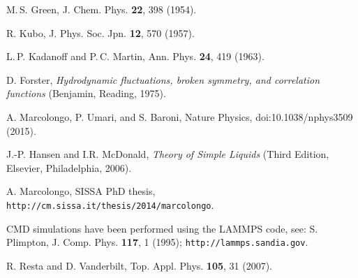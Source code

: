 \begin{thebibliography}{10}

M.\,S. Green, J. Chem. Phys. \textbf{22}, 398
(1954).

R. Kubo, J. Phys. Soc. Jpn. \textbf{12}, 570 (1957).

 L.\,P. Kadanoff and P.\,C. Martin, Ann.
Phys. \textbf{24}, 419 (1963).

D. Forster, \emph{Hydrodynamic fluctuations, broken
symmetry, and correlation functions} (Benjamin, Reading, 1975).

 A. Marcolongo, P. Umari, and S. Baroni,
Nature Physics, doi:10.1038/nphys3509 (2015).

 J.-P. Hansen and I.R. McDonald, \emph{Theory
of Simple Liquids} (Third Edition, Elsevier, Philadelphia, 2006).

 A. Marcolongo, SISSA PhD thesis,
  \texttt{http://cm.sissa.it/thesis/2014/marcolongo}. 

CMD simulations have been performed using the
LAMMPS code, see: S. Plimpton, J. Comp. Phys. \textbf{117}, 1 (1995);
\texttt{http://lammps.sandia.gov}. 

 R. Resta and D. Vanderbilt,
  Top. Appl. Phys. \textbf{105}, 31 (2007).


\end{thebibliography}

